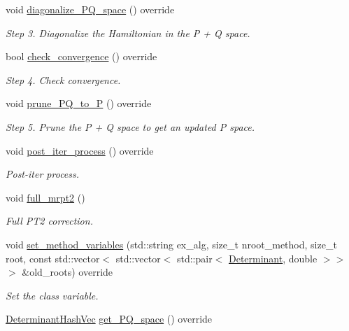 \begin{DoxyCompactItemize}
void \mbox{\hyperlink{classforte_1_1_adaptive_c_i_a307427ce58102e4a818b2e97583e2ac1}{diagonalize\+\_\+\+P\+Q\+\_\+space}} () override
\begin{DoxyCompactList}\small\item\em Step 3. Diagonalize the Hamiltonian in the P + Q space. \end{DoxyCompactList}\item 
bool \mbox{\hyperlink{classforte_1_1_adaptive_c_i_a2682a80aa48f7cd49c295efb826f30ca}{check\+\_\+convergence}} () override
\begin{DoxyCompactList}\small\item\em Step 4. Check convergence. \end{DoxyCompactList}\item 
void \mbox{\hyperlink{classforte_1_1_adaptive_c_i_abb5fb23e0c3d2575b9a5c9785bdc9f75}{prune\+\_\+\+P\+Q\+\_\+to\+\_\+P}} () override
\begin{DoxyCompactList}\small\item\em Step 5. Prune the P + Q space to get an updated P space. \end{DoxyCompactList}\item 
void \mbox{\hyperlink{classforte_1_1_adaptive_c_i_aebb7aa6e06ce5b45c4c5b2da1b1703c1}{post\+\_\+iter\+\_\+process}} () override
\begin{DoxyCompactList}\small\item\em Post-\/iter process. \end{DoxyCompactList}\item 
void \mbox{\hyperlink{classforte_1_1_adaptive_c_i_a3cb865ccab03a377e0ac3a0d65cda9f5}{full\+\_\+mrpt2}} ()
\begin{DoxyCompactList}\small\item\em Full P\+T2 correction. \end{DoxyCompactList}\item 
void \mbox{\hyperlink{classforte_1_1_adaptive_c_i_a74874a321e8077f0af18967e9e2ebfd4}{set\+\_\+method\+\_\+variables}} (std\+::string ex\+\_\+alg, size\+\_\+t nroot\+\_\+method, size\+\_\+t root, const std\+::vector$<$ std\+::vector$<$ std\+::pair$<$ \mbox{\hyperlink{namespaceforte_a2076c63fd7b8732004d9e1442ce527c1}{Determinant}}, double $>$$>$$>$ \&old\+\_\+roots) override
\begin{DoxyCompactList}\small\item\em Set the class variable. \end{DoxyCompactList}\item 
\mbox{\hyperlink{classforte_1_1_determinant_hash_vec}{Determinant\+Hash\+Vec}} \mbox{\hyperlink{classforte_1_1_adaptive_c_i_af7e800fcfe0d1c2b674cf8cd2c4f41d0}{get\+\_\+\+P\+Q\+\_\+space}} () override

\end{DoxyCompactItemize}
